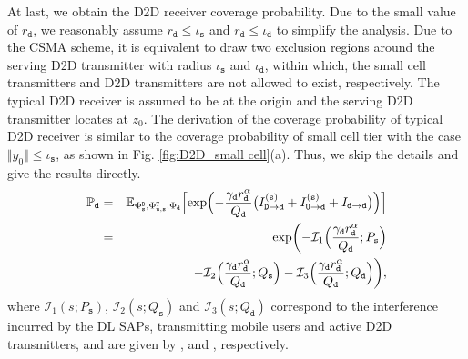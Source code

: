 \documentclass[twocolumn,english]{IEEEtran}
\theoremstyle{plain}
\theoremstyle{definition}
\begin{document}
At last, we obtain the D2D receiver coverage probability. Due to the
small value of $r_{\mathtt{d}}$, we reasonably assume $r_{\mathtt{d}}\leq\iota_{\mathtt{s}}$
and $r_{\mathtt{d}}\leq\iota_{\mathtt{d}}$ to simplify the analysis.
Due to the CSMA scheme, it is equivalent to draw two exclusion regions
around the serving D2D transmitter with radius $\iota_{\mathtt{s}}$
and $\iota_{\mathtt{d}}$, within which, the small cell transmitters
and D2D transmitters are not allowed to exist, respectively. The typical
D2D receiver is assumed to be at the origin and the serving D2D transmitter
locates at $z_{0}$. The derivation of the coverage probability of
typical D2D receiver is similar to the coverage probability of small
cell tier with the case $\Vert y_{0}\Vert\leq\iota_{\mathtt{s}}$,
as shown in Fig. \ref{fig:D2D_small cell}(a). Thus, we skip the details
and give the results directly.
\begin{eqnarray}
\mathbb{P}_{\mathtt{d}} & = & \mathbb{E}_{\Phi_{\mathtt{s}}^{\mathtt{D}},\Phi_{\mathtt{u},\mathtt{s}}^{\mathtt{T}},\Phi_{\mathtt{d}}}\Bigl[\exp\Bigl(-\frac{\gamma_{\mathtt{d}}r_{\mathtt{d}}^{\alpha}}{Q_{\mathtt{d}}}\bigl(I_{\mathtt{D\rightarrow d}}^{\mathtt{(s)}}+I_{\mathtt{U\rightarrow d}}^{\mathtt{(s)}}+I_{\mathtt{d\rightarrow d}}\bigr)\Bigr)\Bigr]\nonumber \\
 & = & \exp\biggl(-\mathcal{I}_{1}\Bigl(\frac{\gamma_{\mathtt{d}}r_{\mathtt{d}}^{\alpha}}{Q_{\mathtt{d}}};P_{\mathtt{s}}\Bigr)\nonumber \\
 &  & -\mathcal{I}_{2}\Bigl(\frac{\gamma_{\mathtt{d}}r_{\mathtt{d}}^{\alpha}}{Q_{\mathtt{d}}};Q_{\mathtt{s}}\Bigr)-\mathcal{I}_{3}\Bigl(\frac{\gamma_{\mathtt{d}}r_{\mathtt{d}}^{\alpha}}{Q_{\mathtt{d}}};Q_{\mathtt{d}}\Bigr)\biggr),
\end{eqnarray}
where $\mathcal{I}_{1}\left(s;P_{\mathtt{s}}\right)$, $\mathcal{I}_{2}\left(s;Q_{\mathtt{s}}\right)$
and $\mathcal{I}_{3}\left(s;Q_{\mathtt{d}}\right)$ correspond to
the interference incurred by the DL SAPs, transmitting mobile users
and active D2D transmitters, and are given by ,
 and , respectively.



\end{document}
